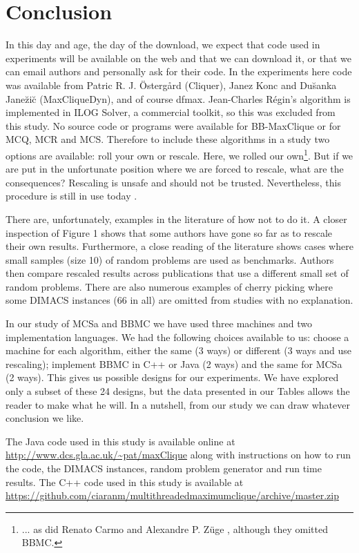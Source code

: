 \documentclass[runningheads]{llncs}
\begin{document}
\section{Conclusion}
\vspace{-1.5mm}
In this day and age, the day of the download, we expect that code used in experiments will be available on the web
and that we can download it, or that we can email authors and personally ask for their code. In the experiments here code was available 
from Patric R. J. \"{O}sterg\aa{}rd (Cliquer), Janez Konc and Du\u{s}anka Jane\u{z}i\u{c} (MaxCliqueDyn), and of course dfmax.
Jean-Charles R\'{e}gin's algorithm is implemented in ILOG Solver, a commercial toolkit, so this was excluded from this study. 
No source code or programs were available for BB-MaxClique or for MCQ, MCR and MCS. Therefore to include
these algorithms in a study two options are available: roll your own or rescale. Here, we rolled our own\footnote{... as did Renato Carmo and
Alexandre P. Z{\"u}ge \cite{carmoZuge}, although they omitted BBMC.}.
But if we are put in the unfortunate position where we are forced to rescale, what are the consequences?
Rescaling is unsafe and should not be trusted.  Nevertheless, this procedure is still in use today \cite{MCMD14}.

There are, unfortunately, examples in the literature of how not to do it. A closer inspection of Figure 1 shows
that some authors have gone so far as to rescale their own results. Furthermore, a close reading of the literature
shows cases where small samples (size 10) of random problems are used as benchmarks. 
Authors then compare rescaled results across publications that use a different small set of random problems.
There are also numerous examples of cherry picking where some DIMACS instances (66 in all) are omitted from studies with no explanation.

In our study of MCSa and BBMC we have used three machines and two implementation languages. We had the following 
choices available to us: choose a machine for each algorithm, either the same (3 ways) or different (3 ways and use rescaling);
implement BBMC in C++ or Java (2 ways) and the same for MCSa (2 ways). This gives us  possible 
designs for our experiments. We have explored only a subset of these 24 designs, but the data presented in our Tables allows the reader 
to make what he will. In a nutshell, from our study we can draw whatever conclusion we like.

The Java code used in this study is available online at \url{http://www.dcs.gla.ac.uk/~pat/maxClique} along with instructions on how to 
run the code, the DIMACS instances, random problem generator and run time results. 
The C++ code used in this study is available at \url{https://github.com/ciaranm/multithreadedmaximumclique/archive/master.zip}
\vspace{-2mm}
\end{document}

